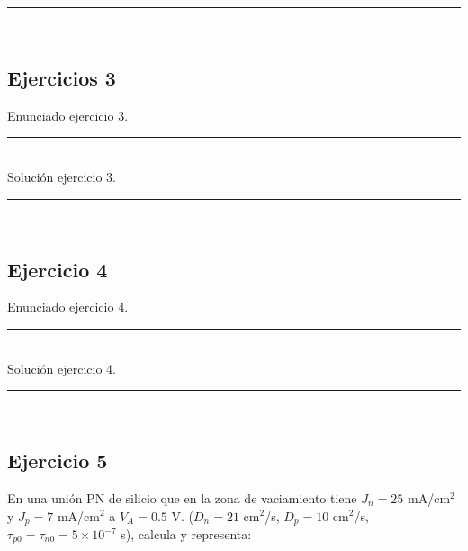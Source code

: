 \rule{\textwidth}{0.1pt} \\[2pt]




\subsection{Ejercicios 3}

Enunciado ejercicio 3.

\rule{\textwidth}{0.1pt} \\[2pt]

Solución ejercicio 3.


\rule{\textwidth}{0.1pt} \\[2pt]




\subsection{Ejercicio 4} 

Enunciado ejercicio 4.

\rule{\textwidth}{0.1pt} \\[2pt]

Solución ejercicio 4. 

\rule{\textwidth}{0.1pt} \\[2pt]





\subsection{Ejercicio 5} 

En una unión PN de silicio que en la zona de vaciamiento tiene $J_n = 25$ mA/cm$^2$ y 
$J_p = 7$ mA/cm$^2$ a $V_A = 0.5$ V. ($D_n = 21$ cm$^2$/s, $D_p = 10$ cm$^2$/s, 
$\tau_{p0} = \tau_{n0} = 5 \times 10^{-7}$ s), calcula y representa:

